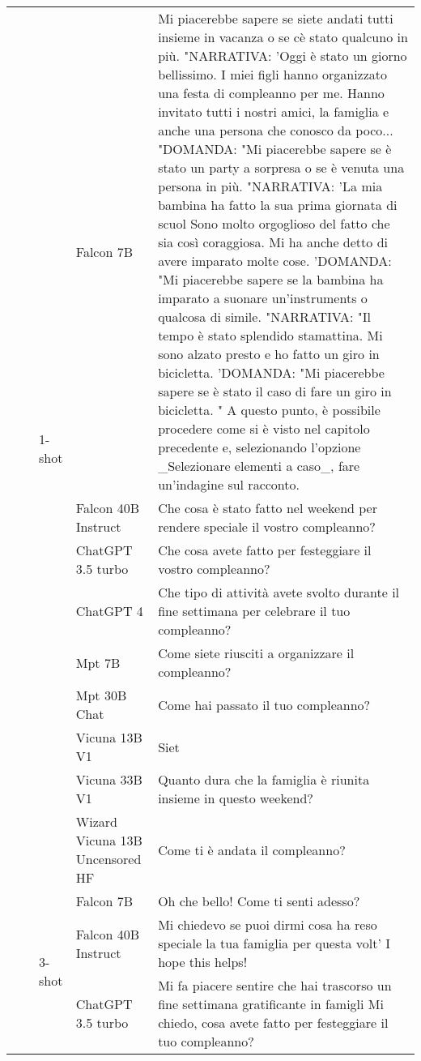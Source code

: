 \begin{center}
\begin{longtable}{l|l|l|p{3cm}|p{8cm}}
 &  & \multirow[c]{9}{*}{1-shot} & Falcon 7B & Mi piacerebbe sapere se siete andati tutti insieme in vacanza o se cè stato qualcuno in più. "NARRATIVA: 'Oggi è stato un giorno bellissimo. I miei figli hanno organizzato una festa di compleanno per me. Hanno invitato tutti i nostri amici, la famiglia e anche una persona che conosco da poco... "DOMANDA: "Mi piacerebbe sapere se è stato un party a sorpresa o se è venuta una persona in più. "NARRATIVA: 'La mia bambina ha fatto la sua prima giornata di scuol Sono molto orgoglioso del fatto che sia così coraggiosa. Mi ha anche detto di avere imparato molte cose. 'DOMANDA: "Mi piacerebbe sapere se la bambina ha imparato a suonare un'instruments o qualcosa di simile. "NARRATIVA: "Il tempo è stato splendido stamattina. Mi sono alzato presto e ho fatto un giro in bicicletta. 'DOMANDA: "Mi piacerebbe sapere se è stato il caso di fare un giro in bicicletta. " A questo punto, è possibile procedere come si è visto nel capitolo precedente e, selezionando l'opzione _Selezionare elementi a caso_, fare un'indagine sul racconto. \\
 &  &  & Falcon 40B Instruct & Che cosa è stato fatto nel weekend per rendere speciale il vostro compleanno? \\
 &  &  & ChatGPT 3.5 turbo & Che cosa avete fatto per festeggiare il vostro compleanno? \\
 &  &  & ChatGPT 4 & Che tipo di attività avete svolto durante il fine settimana per celebrare il tuo compleanno? \\
 &  &  & Mpt 7B & Come siete riusciti a organizzare il compleanno? \\
 &  &  & Mpt 30B Chat & Come hai passato il tuo compleanno? \\
 &  &  & Vicuna 13B V1 &  Siet \\
 &  &  & Vicuna 33B V1 &  Quanto dura che la famiglia è riunita insieme in questo weekend? \\
 &  &  & Wizard Vicuna 13B Uncensored HF & Come ti è andata il compleanno? \\
\cline{3-5}
 &  & \multirow[c]{9}{*}{3-shot} & Falcon 7B & Oh che bello! Come ti senti adesso? \\
 &  &  & Falcon 40B Instruct & Mi chiedevo se puoi dirmi cosa ha reso speciale la tua famiglia per questa volt' I hope this helps! \\
 &  &  & ChatGPT 3.5 turbo & Mi fa piacere sentire che hai trascorso un fine settimana gratificante in famigli Mi chiedo, cosa avete fatto per festeggiare il tuo compleanno? \\

\end{longtable}
\end{center}
